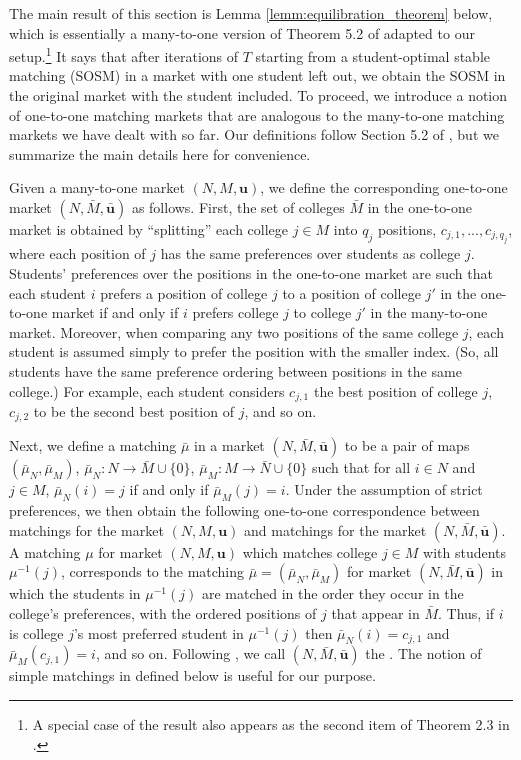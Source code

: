 \documentclass[12pt, fullpage]{amsart}
\theoremstyle{definition}
\theoremstyle{definition}
\theoremstyle{definition}
\begin{document}
\begin{bibunit}[econometrica]
The main result of this section is Lemma \ref{lemm:equilibration_theorem} below, which is essentially a many-to-one version of Theorem 5.2 of \cite{Blum/Roth/Rothblum:1997:JET} adapted to our setup.\footnote{A special case of the result also appears as the second item of Theorem 2.3 in \citet{Blum/Rothblum/2002}. } It says that after iterations of $T$ starting from a student-optimal stable matching (SOSM) in a market with one student left out, we obtain the SOSM in the original market with the student included. To proceed, we introduce a notion of one-to-one
matching markets that are analogous to the many-to-one matching markets we have dealt
with so far. Our definitions follow Section 5.2 of \cite{Roth/Sotomayor:90:TwoSidedMatching}, but we summarize the main details here for convenience.

Given a many-to-one market $(N,M,\boldsymbol{u})$, we define the corresponding one-to-one market  $(N,\bar{M},\boldsymbol{\bar{u}})$ as follows. First, the set of colleges $\bar{M}$ in the one-to-one market is obtained by ``splitting'' each college $j\in M$ into $q_{j}$ positions, $c_{j,1},...,c_{j,q_{j}}$, where each position of $j$ has the same preferences over students as college $j$.  Students' preferences over the positions in the one-to-one market are such that each student $i$ prefers a position of college $j$ to a position of college $j'$ in the one-to-one market  if and only if $i$ prefers college $j$ to college $j'$ in the many-to-one market. Moreover, when comparing any two positions of the same college $j$, each student is assumed simply to prefer the position with the smaller index. (So, all students have the same preference ordering between positions in the same college.) For example, each student considers $c_{j,1}$ the best position of college $j$, $c_{j,2}$ to be the second best position of $j$, and so on. 


Next, we define a matching $\bar{\mu}$ in a market $(N,\bar{M},\boldsymbol{\bar{u}})$ to be a
pair of maps $(\bar{\mu}_{N},\bar{\mu}_{M})$, $\bar{\mu}_{N}: N\rightarrow \bar{M}\cup\{0\}$, $\bar{\mu}_{M}:M\rightarrow \bar{N}\cup\{0\}$ such that for all $i\in N$ and $j\in M$, $\bar{\mu}_{N}(i)=j$ if and only if $\bar{\mu}_{M}(j)=i$. Under the assumption of strict preferences, we then obtain the following one-to-one correspondence between matchings for the market $(N,M,\boldsymbol{u})$ and matchings for the market  $(N,\bar{M},\boldsymbol{\bar{u}})$. 
A matching $\mu$ for market $(N,M,\boldsymbol{u})$ which matches college $j\in M$ with students $\mu^{-1}(j)$, corresponds to the matching $\bar{\mu}=(\bar{\mu}_{N},\bar{\mu}_{M})$ for market $(N,\bar{M},\boldsymbol{\bar{u}})$ in which the students  in $\mu^{-1}(j)$ are matched in the order they occur in the college's preferences, with the ordered positions of $j$ that appear in $\bar{M}$. Thus, if $i$ is college $j$'s most preferred student in $\mu^{-1}(j)$ then $\bar{\mu}_{N}(i)=c_{j,1}$ and $\bar{\mu}_{M}(c_{j,1})=i$, and so on. Following \cite{Roth/Sotomayor:90:TwoSidedMatching}, we call $(N,\bar{M},\boldsymbol{\bar{u}})$ the . The notion of simple matchings in \citet{Sotomayor:1996:GEB} defined below is useful for our purpose.


\end{bibunit}
\end{document}
